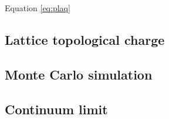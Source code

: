 Equation \eqref{eq:plaq} 

\subsection*{Lattice topological charge}

\subsection*{Monte Carlo simulation}

\subsection*{Continuum limit}








